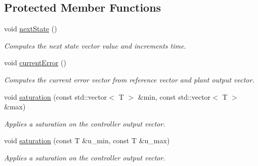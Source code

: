 \subsection*{Protected Member Functions}
\begin{DoxyCompactItemize}
\item 
\mbox{\label{classStateSpaceController_a8b9390481cac910d97a8a072d8a55929}} 
void \hyperlink{classStateSpaceController_a8b9390481cac910d97a8a072d8a55929}{next\+State} ()
\begin{DoxyCompactList}\small\item\em Computes the next state vector value and increments time. \end{DoxyCompactList}\item 
\mbox{\label{classStateSpaceController_a57922a81c4b76cd435fed41fa235b782}} 
void \hyperlink{classStateSpaceController_a57922a81c4b76cd435fed41fa235b782}{current\+Error} ()
\begin{DoxyCompactList}\small\item\em Computes the current error vector from reference vector and plant output vector. \end{DoxyCompactList}\item 
void \hyperlink{classStateSpaceController_a865cbded7c2a220adcbfec1d6caea616}{saturation} (const std\+::vector$<$ T $>$ \&min, const std\+::vector$<$ T $>$ \&max)
\begin{DoxyCompactList}\small\item\em Applies a saturation on the controller output vector. \end{DoxyCompactList}\item 
void \hyperlink{classStateSpaceController_adf60d82cf62f5cfcf77ca80b294599e5}{saturation} (const T \&u\+\_\+min, const T \&u\+\_\+max)
\begin{DoxyCompactList}\small\item\em Applies a saturation on the controller output vector. \end{DoxyCompactList}\end{DoxyCompactItemize}
